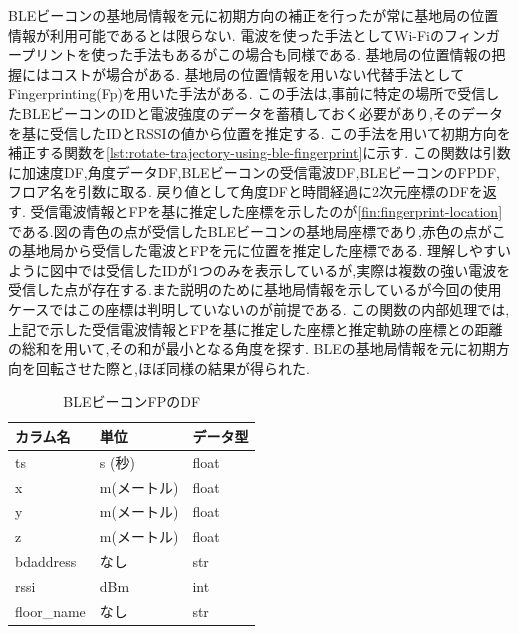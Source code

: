 BLEビーコンの基地局情報を元に初期方向の補正を行ったが常に基地局の位置情報が利用可能であるとは限らない.
電波を使った手法としてWi-Fiのフィンガープリントを使った手法もあるがこの場合も同様である.
基地局の位置情報の把握にはコストが場合がある.
基地局の位置情報を用いない代替手法としてFingerprinting(Fp)を用いた手法がある.
この手法は,事前に特定の場所で受信したBLEビーコンのIDと電波強度のデータを蓄積しておく必要があり,そのデータを基に受信したIDとRSSIの値から位置を推定する.
この手法を用いて初期方向を補正する関数を\ref{lst:rotate-trajectory-using-ble-fingerprint}に示す.
この関数は引数に加速度DF,角度データDF,BLEビーコンの受信電波DF,BLEビーコンのFPDF,フロア名を引数に取る.
戻り値として角度DFと時間経過に2次元座標のDFを返す.
受信電波情報とFPを基に推定した座標を示したのが\ref{fin:fingerprint-location}である.図の青色の点が受信したBLEビーコンの基地局座標であり,赤色の点がこの基地局から受信した電波とFPを元に位置を推定した座標である.
理解しやすいように図中では受信したIDが1つのみを表示しているが,実際は複数の強い電波を受信した点が存在する.また説明のために基地局情報を示しているが今回の使用ケースではこの座標は判明していないのが前提である.
この関数の内部処理では,上記で示した受信電波情報とFPを基に推定した座標と推定軌跡の座標との距離の総和を用いて,その和が最小となる角度を探す.
BLEの基地局情報を元に初期方向を回転させた際と,ほぼ同様の結果が得られた.


\begin{table}[ht]
	\centering
	\begin{tabular}{lll}
		\toprule
		カラム名        & 単位      & データ型  \\
		\midrule
		ts          & s (秒)   & float \\
		x           & m(メートル) & float \\
		y           & m(メートル) & float \\
		z           & m(メートル) & float \\
		bdaddress   & なし      & str   \\
		rssi        & dBm     & int   \\
		floor\_name & なし      & str   \\
		\bottomrule
	\end{tabular}
	\caption{BLEビーコンFPのDF}
	\label{table:ble-beacon-fingerprint-df}
\end{table}


